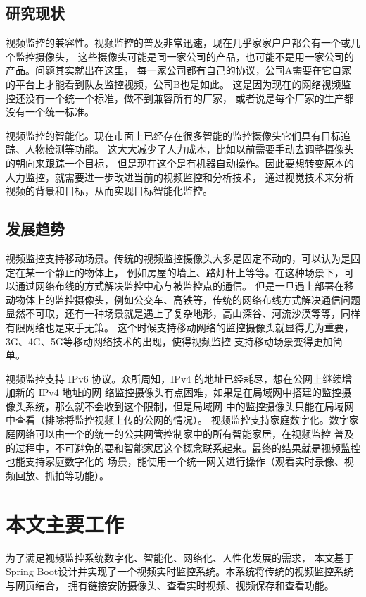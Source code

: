 \subsection{研究现状}
视频监控的兼容性。视频监控的普及非常迅速，现在几乎家家户户都会有一个或几个监控摄像头，
这些摄像头可能是同一家公司的产品，也可能不是用一家公司的产品。问题其实就出在这里，
每一家公司都有自己的协议，公司A需要在它自家的平台上才能看到队友监控视频，公司B也是如此。
这是因为现在的网络视频监控还没有一个统一个标准，做不到兼容所有的厂家，
或者说是每个厂家的生产都没有一个统一标准。

视频监控的智能化。现在市面上已经存在很多智能的监控摄像头它们具有目标追踪、人物检测等功能。
这大大减少了人力成本，比如以前需要手动去调整摄像头的朝向来跟踪一个目标，
但是现在这个是有机器自动操作。因此要想转变原本的人力监控，就需要进一步改进当前的视频监控和分析技术，
通过视觉技术来分析视频的背景和目标，从而实现目标智能化监控。

\subsection{发展趋势}
视频监控支持移动场景。传统的视频监控摄像头大多是固定不动的，可以认为是固定在某一个静止的物体上，
例如房屋的墙上、路灯杆上等等。在这种场景下，可以通过网络布线的方式解决监控中心与被监控点的通信。
但是一旦遇上部署在移动物体上的监控摄像头，例如公交车、高铁等，传统的网络布线方式解决通信问题
显然不可取，还有一种场景就是遇上了复杂地形，高山深谷、河流沙漠等等，同样有限网络也是束手无策。
这个时候支持移动网络的监控摄像头就显得尤为重要，3G、4G、5G等移动网络技术的出现，使得视频监控
支持移动场景变得更加简单。

视频监控支持 IPv6 协议。众所周知，IPv4 的地址已经耗尽，想在公网上继续增加新的 IPv4 地址的网
络监控摄像头有点困难，如果是在局域网中搭建的监控摄像头系统，那么就不会收到这个限制，但是局域网
中的监控摄像头只能在局域网中查看（排除将监控视频上传的公网的情况）。
视频监控支持家庭数字化。数字家庭网络可以由一个的统一的公共网管控制家中的所有智能家居，在视频监控
普及的过程中，不可避免的要和智能家居这个概念联系起来。最终的结果就是视频监控也能支持家庭数字化的
场景，能使用一个统一网关进行操作（观看实时录像、视频回放、抓拍等功能）。

\section{本文主要工作}
为了满足视频监控系统数字化、智能化、网络化、人性化发展的需求，
本文基于Spring Boot设计并实现了一个视频实时监控系统。本系统将传统的视频监控系统与网页结合，
拥有链接安防摄像头、查看实时视频、视频保存和查看功能。

